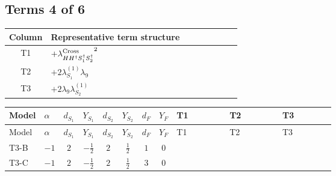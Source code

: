 \documentclass[8pt]{article}
\begin{document}
\begin{landscape}
\subsection*{Terms 4 of 6}
\begin{center}
\begin{tabular}{@{}c >{\raggedright\arraybackslash}p{0.82\linewidth}@{}}
\toprule
Column & Representative term structure \\
\midrule
T1 & \(\displaystyle +{\lambda_{H H^\dagger S_1^\dagger S_2^\dagger}^{\rm Cross}}^2\) \\
\midrule
T2 & \(\displaystyle +2 {\lambda_{S_1}^{(1)}} {\lambda_{9}}\) \\
\midrule
T3 & \(\displaystyle +2 {\lambda_{9}} {\lambda_{S_2}^{(1)}}\) \\
\midrule
\bottomrule
\end{tabular}
\end{center}
\smallskip
\tiny
\begin{longtable}{@{}llcccccc >{\raggedright\arraybackslash}p{0.21\linewidth} >{\raggedright\arraybackslash}p{0.21\linewidth} >{\raggedright\arraybackslash}p{0.21\linewidth}@{}}
\toprule
Model & $\alpha$ & $d_{S_1}$ & $Y_{S_1}$ & $d_{S_2}$ & $Y_{S_2}$ & $d_F$ & $Y_F$ & T1 & T2 & T3 \\
\midrule
\endfirsthead
\toprule
Model & $\alpha$ & $d_{S_1}$ & $Y_{S_1}$ & $d_{S_2}$ & $Y_{S_2}$ & $d_F$ & $Y_F$ & T1 & T2 & T3 \\
\midrule
\endhead
T3-B & $-1$ & $2$ & $-\frac{1}{2}$ & $2$ & $\frac{1}{2}$ & $1$ & $0$ & \scriptsize\adjustbox{max width=\linewidth}{$\begin{gathered} +{\lambda_{H H^\dagger S_1^\dagger S_2^\dagger}^{\rm Cross}}^2\end{gathered}$} & \scriptsize\adjustbox{max width=\linewidth}{$\begin{gathered} +2 {\lambda_{S_1}^{(1)}} {\lambda_{9}}\end{gathered}$} & \scriptsize\adjustbox{max width=\linewidth}{$\begin{gathered} +2 {\lambda_{9}} {\lambda_{S_2}^{(1)}}\end{gathered}$} \\
\midrule
T3-C & $-1$ & $2$ & $-\frac{1}{2}$ & $2$ & $\frac{1}{2}$ & $3$ & $0$ & \scriptsize\adjustbox{max width=\linewidth}{$\begin{gathered} +{\lambda_{H H^\dagger S_1^\dagger S_2^\dagger}^{\rm Cross}}^2\end{gathered}$} & \scriptsize\adjustbox{max width=\linewidth}{$\begin{gathered} +2 {\lambda_{S_1}^{(1)}} {\lambda_{9}}\end{gathered}$} & \scriptsize\adjustbox{max width=\linewidth}{$\begin{gathered} +2 {\lambda_{9}} {\lambda_{S_2}^{(1)}}\end{gathered}$} \\

\end{longtable}
\end{landscape}
\end{document}
